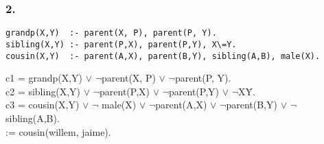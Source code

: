 \documentclass[10pt, a4paper]{article}
\begin{document}
\subsubsection{2.}
\begin{verbatim}
grandp(X,Y)  :- parent(X, P), parent(P, Y).
sibling(X,Y) :- parent(P,X), parent(P,Y), X\=Y.
cousin(X,Y)  :- parent(A,X), parent(B,Y), sibling(A,B), male(X).

\end{verbatim}
c1 = grandp(X,Y)  $\vee$ $\neg$parent(X, P) $\vee$ $\neg$parent(P, Y).\\
c2 = sibling(X,Y) $\vee$ $\neg$parent(P,X) $\vee$ $\neg$parent(P,Y) $\vee$ $\neg$X\=Y.\\
c3 = cousin(X,Y)  $\vee$ $\neg$ male(X) $\vee$ $\neg$parent(A,X) $\vee$ $\neg$parent(B,Y) $\vee$ $\neg$ sibling(A,B). \\

:= cousin(willem, jaime).\\
\end{document}

